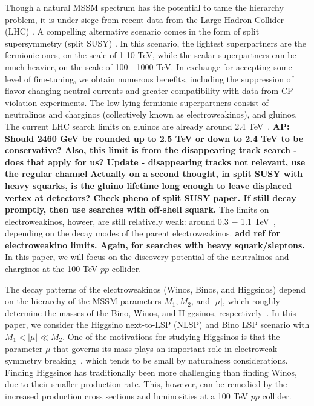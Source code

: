 \documentclass[a4paper,11pt]{article}
\newcommand{\Shufang}[1]{{\bf\color{Maroon}  #1}}
\newcommand{\Adarsh}[1]{{\bf\color{RoyalBlue} AP: #1}}
\begin{document}
Though a natural MSSM spectrum has the potential to tame the hierarchy
problem, it is under siege from recent data from the Large Hadron
Collider (LHC) \cite{Aaboud:2018ujj, Sirunyan:2018vjp}. 
A compelling alternative scenario comes in the form of
split supersymmetry (split SUSY) \citep{Wells:2003tf,
ArkaniHamed:2004yi, Giudice:2004tc}. In this scenario, the lightest
superpartners are the fermionic ones, on the
scale of 1-10 TeV, while the scalar superpartners can be much heavier,
on the scale of 100 - 1000 TeV. In exchange for accepting some level of
fine-tuning, we obtain numerous benefits, including the suppression of
flavor-changing neutral currents and greater compatibility with data
from CP-violation experiments.  The low lying 
fermionic superpartners consist of neutralinos and charginos (collectively
known as electroweakinos), and gluinos. The current LHC search limits on
gluinos are already around 2.4 TeV~\cite{CMS-PAS-SUS-19-005}. \Adarsh{Should
2460 GeV be rounded up to 2.5 TeV or down to 2.4 TeV to be conservative? Also,
this limit is from the disappearing track search - does that apply for us? Update - disappearing tracks not relevant, use the regular channel} \Shufang{Actually on a second thought, in split SUSY with heavy squarks, is the gluino lifetime long enough to leave displaced vertex at detectors? Check pheno of split SUSY paper. If still decay promptly, then use searches with off-shell squark.} The
limits on electroweakinos,
howeer, are still relatively weak: around 0.3 $-$ 1.1 
TeV~\cite{ATL-PHYS-PUB-2019-022, Sirunyan:2017lae}, depending on
the decay modes of the parent electroweakinos.  \Shufang{add ref for 
electroweakino limits.  Again, for searches with heavy squark/sleptons.} In this paper, we will
focus on the discovery potential of the neutralinos and charginos at the 100
TeV $pp$ collider. 

The decay patterns of the electroweakinos (Winos, Binos, and Higgsinos)
depend on the hierarchy of the MSSM parameters $M_1, M_2$, and $|\mu|$, which 
roughly determine the masses of the Bino, Winos, and Higgsinos, respectively~\citep{Han:2013kz}. 
In this paper, we consider the Higgsino next-to-LSP (NLSP) and Bino LSP scenario with $M_1 < |\mu| \ll M_2$.
One of the motivations for studying Higgsinos is that the parameter $\mu$ 
that governs its mass plays an important role in electroweak symmetry breaking~\citep{Acharya:2014pua}, which tends to be small by naturalness considerations.   Finding Higgsinos has traditionally been more challenging 
than finding Winos, due to their smaller production rate. This, however, can 
be remedied by the increased  production cross sections and luminosities 
at a 100 TeV $pp$ collider.
\end{document}
